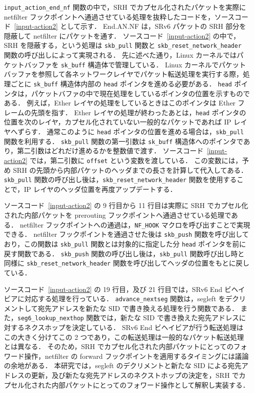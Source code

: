 \texttt{input\_action\_end\_nf} 関数の中で，SRH でカプセル化されたパケットを実際に netfilter フックポイントへ通過させている処理を抜粋したコードを，ソースコード~\ref*{input-action2} として示す．
End.AN.NF は，SRv6 パケットの SRH 部分を隠蔽して netfilter にパケットを通す．
ソースコード~\ref*{input-action2} の中で，SRH を隠蔽する，という処理は \texttt{skb\_pull} 関数と \texttt{skb\_reset\_network\_header} 関数の呼び出しによって実現される．
先に述べた通り，Linux カーネルではパケットバッファを \texttt{sk\_buff} 構造体で管理している．
Linux カーネルでパケットバッファを参照して各ネットワークレイヤでパケット転送処理を実行する際，処理ごとに \texttt{sk\_buff} 構造体内部の \texttt{head} ポインタを進める必要がある．
\texttt{head} ポインタは，パケットバファの中で現在処理をしているポインタの位置を示すものである．
例えば，Ether レイヤの処理をしているときはこのポインタは Ether フレームの先頭を指す．
Ether レイヤの処理が終わったあとは，\texttt{head} ポインタの位置を次のレイヤ，カプセル化されていない一般的なパケットであれば IP レイヤへずらす．
通常このように \texttt{head} ポインタの位置を進める場合は，\texttt{skb\_pull} 関数を利用する．
\texttt{skb\_pull} 関数の第一引数は \texttt{sk\_buff} 構造体へのポインタであり，第二引数はどれだけ進めるかを整数値で渡す．
ソースコード~\ref*{input-action2} では，第二引数に \texttt{offset} という変数を渡している．
この変数には，予め SRH の先頭から内部パケットのヘッダまでの長さを計算して代入してある．
\texttt{skb\_pull} 関数の呼び出し後は，\texttt{skb\_reset\_network\_header} 関数を使用することで，IP レイヤのヘッダ位置を再度アップデートする．

ソースコード~\ref*{input-action2} の 9 行目から 11 行目は実際に SRH でカプセル化された内部パケットを prerouting フックポイントへ通過させている処理である．
netfilter フックポイントへの通過は，\texttt{NF\_HOOK} マクロを呼び出すことで実現できる．
netfilter フックポイントを通過させた後は \texttt{skb\_push} 関数を呼び出しており，この関数は \texttt{skb\_pull} 関数とは対象的に指定した分 \texttt{head} ポインタを前に戻す関数である．
\texttt{skb\_push} 関数の呼び出し後は，\texttt{skb\_pull} 関数呼び出し時と同様に \texttt{skb\_reset\_network\_header} 関数を呼び出してヘッダの位置をもとに戻している．

ソースコード~\ref*{input-action2} の 19 行目，及び 21 行目では，SRv6 End ビヘイビアに対応する処理を行っている．
\texttt{advance\_nextseg} 関数は，segleft をデクリメントして宛先アドレスを新たな SID で書き換える処理を行う関数である．
また，\texttt{seg6\_lookup\_nexthop} 関数では，新たな SID で書き換えた宛先アドレスに対するネクスホップを決定している．
SRv6 End ビヘイビアが行う転送処理はこの大きく分けてこの 2 つであり，この転送処理は一般的なパケット転送処理とは異なる．
そのため，SRH でカプセル化された内部パケットにとってのフォワード操作，netfilter の forward フックポイントを適用するタイミングには議論の余地がある．
本研究では，segleft のデクリメントと新たな SID による宛先アドレスの更新，及び新たな宛先アドレスのネクストホップの決定を，SRH でカプセル化された内部パケットにとってのフォワード操作として解釈し実装する．

